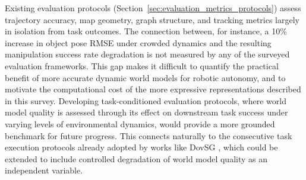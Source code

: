 Existing evaluation protocols (Section~\ref{sec:evaluation_metrics_protocols}) assess trajectory accuracy, map geometry, graph structure, and tracking metrics largely in isolation from task outcomes. 
The connection between, for instance, a 10\% increase in object pose RMSE under crowded dynamics and the resulting manipulation success rate degradation is not measured by any of the surveyed evaluation frameworks. 
This gap makes it difficult to quantify the practical benefit of more accurate dynamic world models for robotic autonomy, and to motivate the computational cost of the more expressive representations described in this survey. 
Developing task-conditioned evaluation protocols, where world model quality is assessed through its effect on downstream task success under varying levels of environmental dynamics, would provide a more grounded benchmark for future progress. 
This connects naturally to the consecutive task execution protocols already adopted by works like DovSG \cite{yan_dynamic_2025}, which could be extended to include controlled degradation of world model quality as an independent variable.




